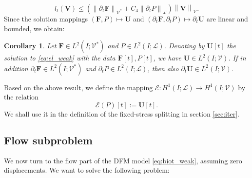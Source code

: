 \documentclass[a4paper]{article}
\newtheorem{corollary}[theorem]{Corollary}
\numberwithin{equation}{section}
\def\dt{\prtl_t}
\def\FF{\vc F}
\def\Hf{\mathscr{L}} %
\def\norm#1{\left\|#1\right\|}
\def\prtl{\partial}
\def\U{\vc U}
\def\V{\vc V}
\def\Vel{{\boldsymbol{\mathcal V}}} %
\def\Vf{{\mathcal V}} %
\def\vc#1{\mathbf{#1}}     %
\newcommand{\eqs}[1]{\begin{equation*}#1\end{equation*}}
\begin{document}
\eqs{ l_t(\V) \le \left(\norm{\dt\FF}_{\Vel^*} + C_4\norm{\dt P}_\Hf\right)\norm{\V}_\Vel. }
Since the solution mappings $(\FF,P) \mapsto \U$ and $(\dt\FF,\dt P)\mapsto\dt\U$ are linear and bounded, we obtain:
\begin{corollary}
Let $\FF\in L^2( I;\Vel^*)$ and $P\in L^2( I;\Hf)$.
Denoting by $\U[t]$ the solution to \eqref{eq:el_weak} with the data $\FF[t],P[t]$, we have $\U\in L^2( I;\Vel)$.
If in addition $\dt\FF\in L^2( I;\Vel^*)$ and $\dt P\in L^2( I;\Hf)$, then also $\dt\U\in L^2( I;\Vel)$.
\end{corollary}
% 
Based on the above result, we define the mapping $\mathcal E: H^1( I;\Hf)\to H^1( I;\Vel)$ by the relation
\eqs{ \mathcal E(P)[t] := \U[t]. }
We shall use it in the definition of the fixed-stress splitting in section \ref{sec:iter}.


\subsection{Flow subproblem}\label{sec:wellposedness_flow}

We now turn to the flow part of the DFM model \eqref{eq:biot_weak}, assuming zero displacements.
We want to solve the following problem:
\end{document}
